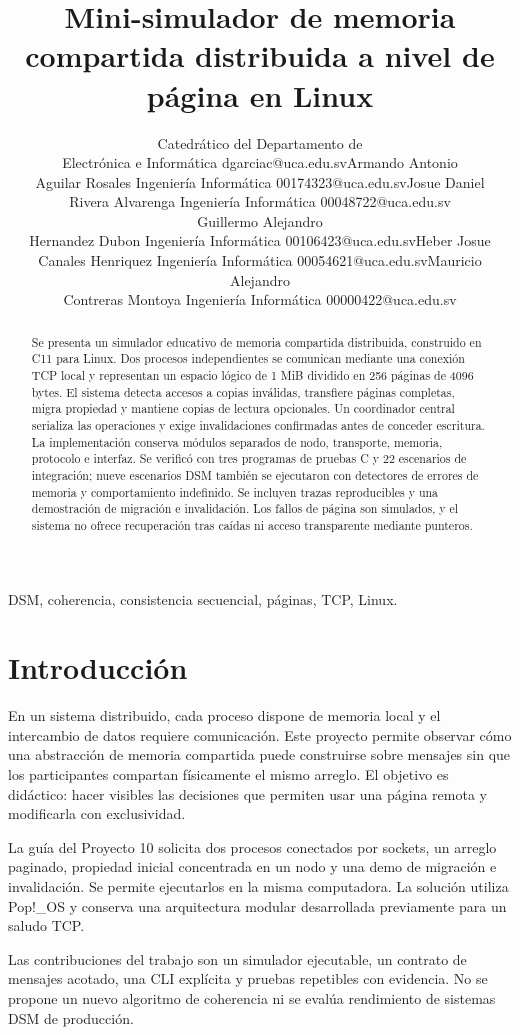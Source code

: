 \documentclass[conference]{IEEEtran}
\title{Mini-simulador de memoria compartida distribuida a nivel de página en Linux}
\author{%
\begin{tabular}{@{}c@{\hspace{0.02\textwidth}}c@{\hspace{0.02\textwidth}}c@{}}
\authorentry{David Garcia Cerna}
  {Catedrático del Departamento de\\Electrónica e Informática}
  {dgarciac@uca.edu.sv}
&
\authorentry{Armando Antonio\\Aguilar Rosales}
  {Ingeniería Informática}
  {00174323@uca.edu.sv}
&
\authorentry{Josue Daniel\\Rivera Alvarenga}
  {Ingeniería Informática}
  {00048722@uca.edu.sv}
\\[1.5em]
\authorentry{Guillermo Alejandro\\Hernandez Dubon}
  {Ingeniería Informática}
  {00106423@uca.edu.sv}
&
\authorentry{Heber Josue\\Canales Henriquez}
  {Ingeniería Informática}
  {00054621@uca.edu.sv}
&
\authorentry{Mauricio Alejandro\\Contreras Montoya}
  {Ingeniería Informática}
  {00000422@uca.edu.sv}
\end{tabular}}
\begin{document}
\maketitle
\begin{abstract}
Se presenta un simulador educativo de memoria compartida distribuida, construido en
C11 para Linux. Dos procesos independientes se comunican mediante una conexión TCP
local y representan un espacio lógico de 1 MiB dividido en 256 páginas de 4096 bytes.
El sistema detecta accesos a copias inválidas, transfiere páginas completas, migra
propiedad y mantiene copias de lectura opcionales. Un coordinador central serializa
las operaciones y exige invalidaciones confirmadas antes de conceder escritura.
La implementación conserva módulos separados de nodo, transporte, memoria, protocolo
e interfaz. Se verificó con tres programas de pruebas C y 22 escenarios de integración;
nueve escenarios DSM también se ejecutaron con detectores de errores de memoria y
comportamiento indefinido. Se incluyen trazas reproducibles y una demostración de
migración e invalidación. Los fallos de página son simulados, y el sistema no ofrece
recuperación tras caídas ni acceso transparente mediante punteros.
\end{abstract}
\begin{IEEEkeywords}
DSM, coherencia, consistencia secuencial, páginas, TCP, Linux.
\end{IEEEkeywords}

\section{Introducción}
En un sistema distribuido, cada proceso dispone de memoria local y el intercambio de
datos requiere comunicación. Este proyecto permite observar cómo una abstracción de
memoria compartida puede construirse sobre mensajes sin que los participantes compartan
físicamente el mismo arreglo. El objetivo es didáctico: hacer visibles las decisiones
que permiten usar una página remota y modificarla con exclusividad.

La guía del Proyecto 10 solicita dos procesos conectados por sockets, un arreglo
paginado, propiedad inicial concentrada en un nodo y una demo de migración e
invalidación. Se permite ejecutarlos en la misma computadora. La solución utiliza
Pop!\_OS y conserva una arquitectura modular desarrollada previamente para un saludo TCP.

Las contribuciones del trabajo son un simulador ejecutable, un contrato de mensajes
acotado, una CLI explícita y pruebas repetibles con evidencia. No se propone un nuevo
algoritmo de coherencia ni se evalúa rendimiento de sistemas DSM de producción.
\end{document}
